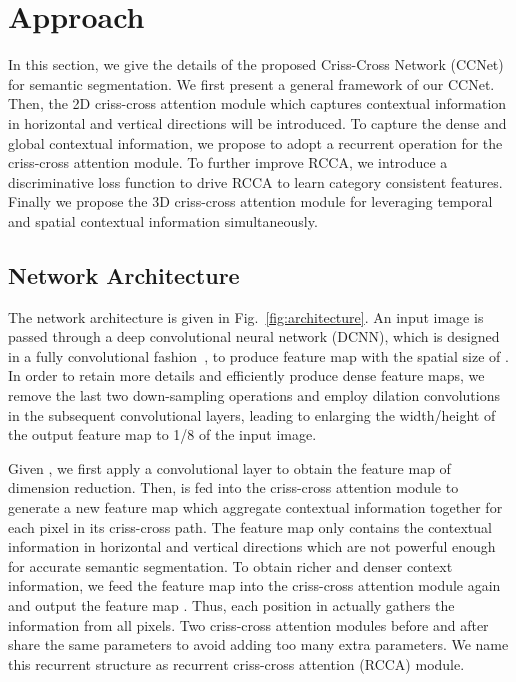 \documentclass[10pt,journal,compsoc]{IEEEtran}
\begin{document}
\section{Approach} \label{CC network}
In this section, we give the details of the proposed Criss-Cross Network (CCNet) for semantic segmentation. We first present a general framework of our CCNet. Then, the 2D criss-cross attention module which captures contextual information in horizontal and vertical directions will be introduced. To capture the dense and global contextual information, we propose to adopt a recurrent operation for the criss-cross attention module. To further improve RCCA, we introduce a discriminative loss function to drive RCCA to learn category consistent features. Finally we propose the 3D criss-cross attention module for leveraging temporal and spatial contextual information simultaneously.

\subsection{Network Architecture}

The network architecture is given in Fig.~\ref{fig:architecture}.
An input image is passed through a deep convolutional neural network (DCNN), which is designed in a fully convolutional fashion~\cite{chen2018deeplab}, to produce feature map  with the spatial size of . In order to retain more details and efficiently produce dense feature maps, we remove the last two down-sampling operations and employ dilation convolutions in the subsequent convolutional layers, leading to enlarging the width/height of the output feature map  to 1/8 of the input image.

Given , we first apply a convolutional layer to obtain the feature map  of dimension reduction. Then,  is fed into the criss-cross attention module to generate a new feature map  which aggregate contextual information together for each pixel in its criss-cross path.  The feature map  only contains the contextual information in horizontal and vertical directions which are not powerful enough for accurate semantic segmentation. To obtain richer and denser context information, we feed the feature map  into the criss-cross attention module again and output the feature map . Thus, each position in  actually gathers the information from all pixels. Two criss-cross attention modules before and after share the same parameters to avoid adding too many extra parameters. We name this recurrent structure as recurrent criss-cross attention (RCCA) module.
\end{document}
